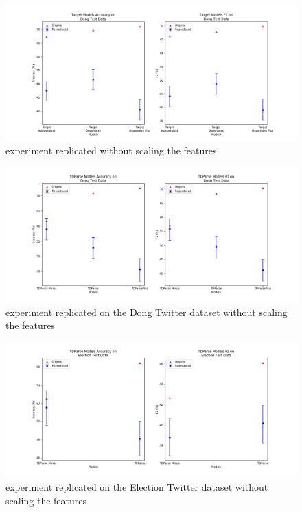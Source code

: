 \begin{figure}[!htb]
    \centering
    \includegraphics[scale=0.35]{images/reproducibility/Parameters/Scaling/Target_Replication_not_scaled_Dong.png}
    \caption{\citet{repro_vo_2015} experiment replicated without scaling the features}
    \label{fig:repro_param_scaling_target_exp}
\end{figure}
\begin{figure}[!htb]
    \centering
    \includegraphics[scale=0.35]{images/reproducibility/Parameters/Scaling/TDParse_Replication_not_scaled_Dong.png}
    \caption{\citet{repro_wang_2017} experiment replicated on the Dong Twitter dataset without scaling the features}
    \label{fig:repro_param_scaling_tdparse_dong}
\end{figure}
\begin{figure}[!htb]
    \centering
    \includegraphics[scale=0.35]{images/reproducibility/Parameters/Scaling/TDParse_Replication_not_scaled_Election.png}
    \caption{\citet{repro_wang_2017} experiment replicated on the Election Twitter dataset without scaling the features}
    \label{fig:repro_param_scaling_tdparse_election}
\end{figure}
